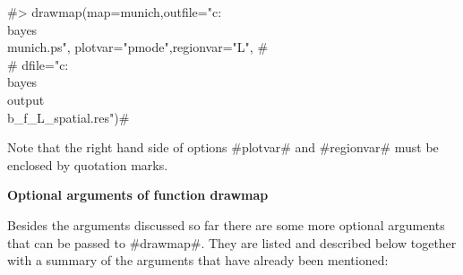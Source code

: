 #> drawmap(map=munich,outfile="c:\\bayes\\munich.ps", plotvar="pmode",regionvar="L", #\\
#  dfile="c:\\bayes\\output\\b_f_L_spatial.res")#

Note that the right hand side of options #plotvar# and #regionvar#
must be enclosed by quotation marks.

{\bf Optional arguments of function drawmap}

Besides the arguments discussed so far there are some more
optional arguments that can be passed to #drawmap#. They are
listed and described below together with a summary of the
arguments that have already been mentioned:


